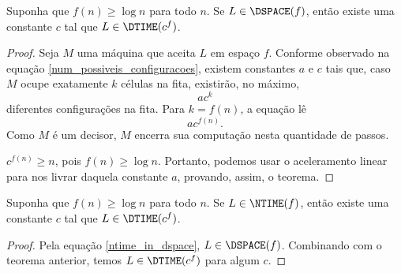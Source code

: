 \begin{theorem}
    Suponha que $f(n) \geq \log n$ para todo $n$.
    Se $L \in \DSPACE(f)$,
    então existe uma constante $c$
    tal que $L \in \DTIME(c^f)$.
\end{theorem}

\begin{proof}
    Seja $M$ uma máquina que aceita $L$ em espaço $f$.
    Conforme observado na equação \ref{num_possiveis_configuracoes},
    existem constantes $a$ e $c$ tais que,
    caso $M$ ocupe exatamente $k$ células na fita,
    existirão, no máximo,
    \begin{equation*}
        ac^k
    \end{equation*}
    diferentes configurações na fita.
    Para $k = f(n)$, a equação lê
    \begin{equation*}
        ac^{f(n)}.
    \end{equation*}
    Como $M$ é um decisor,
    $M$ encerra sua computação nesta quantidade de passos.

    $c^{f(n)} \geq n$, pois $f(n) \geq \log n$.
    Portanto, podemos usar o aceleramento linear
    para nos livrar daquela constante $a$,
    provando, assim, o teorema.
\end{proof}

\begin{theorem}
    Suponha que $f(n) \geq \log n$ para todo $n$.
    Se $L \in \NTIME(f)$,
    então existe uma constante $c$
    tal que $L \in \DTIME(c^f)$.
\end{theorem}

\begin{proof}
    Pela equação \ref{ntime_in_dspace},
    $L \in \DSPACE(f)$.
    Combinando com o teorema anterior,
    temos $L \in \DTIME(c^f)$ para algum $c$.
\end{proof}
